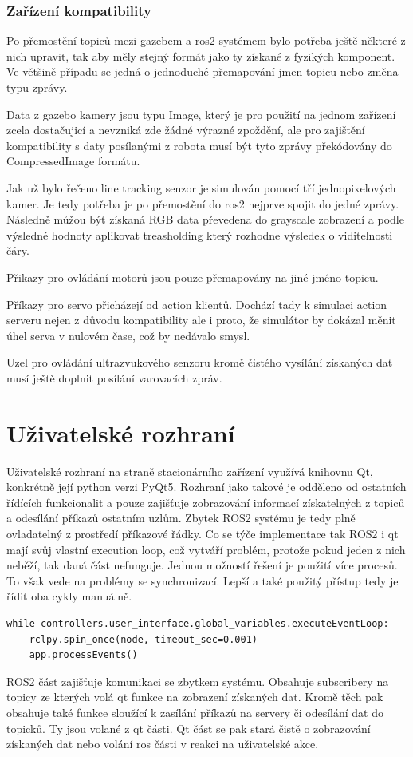 \subsubsection*{Zařízení kompatibility}
Po přemostění topiců mezi gazebem a ros2 systémem bylo potřeba ještě některé z nich upravit, tak aby měly stejný formát jako ty získané z fyzikých komponent. Ve většině případu se jedná o jednoduché přemapování jmen topicu nebo změna typu zprávy. 

Data z gazebo kamery jsou typu Image, který je pro použití na jednom zařízení zcela dostačujicí a nevzniká zde žádné výrazné zpoždění, ale pro zajištění kompatibility s daty posílanými z robota musí být tyto zprávy překódovány do CompressedImage formátu. 

Jak už bylo řečeno line tracking senzor je simulován pomocí tří jednopixelových kamer. Je tedy potřeba je po přemostění do ros2 nejprve spojit do jedné zprávy. Následně můžou být získaná RGB data převedena do grayscale zobrazení a podle výsledné hodnoty aplikovat treasholding který rozhodne výsledek o viditelnosti čáry.

Přikazy pro ovládání motorů jsou pouze přemapovány na jiné jméno topicu.

Příkazy pro servo přicházejí od action klientů. Dochází tady k simulaci action serveru nejen z důvodu kompatibility ale i proto, že simulátor by dokázal měnit úhel serva v nulovém čase, což by nedávalo smysl.

Uzel pro ovládání ultrazvukového senzoru kromě čistého vysílání získaných dat musí ještě doplnit posílání varovacích zpráv.

\section{Uživatelské rozhraní}
Uživatelské rozhraní na straně stacionárního zařízení využívá knihovnu Qt, konkrétně její python verzi PyQt5. Rozhraní jako takové je odděleno od ostatních řídících funkcionalit a pouze zajišťuje zobrazování informací získatelných z topiců a odesílání příkazů ostatním uzlům. Zbytek ROS2 systému je tedy plně ovladatelný z prostředí příkazové řádky. Co se týče implementace tak ROS2 i qt mají svůj vlastní execution loop, což vytváří problém, protože pokud jeden z nich neběží, tak daná část nefunguje. Jednou možností řešení je použití více procesů. To však vede na problémy se synchronizací. Lepší a také použitý přístup tedy je řídit oba cykly manuálně. 
\begin{verbatim}
while controllers.user_interface.global_variables.executeEventLoop:
	rclpy.spin_once(node, timeout_sec=0.001)
	app.processEvents()
\end{verbatim}
ROS2 část zajišťuje komunikaci se zbytkem systému. Obsahuje subscribery na topicy ze kterých volá qt funkce na zobrazení získaných dat. Kromě těch pak obsahuje také funkce sloužící k zasílání příkazů na servery či odesílání dat do topicků. Ty jsou volané z qt části.
Qt část se pak stará čistě o zobrazování získaných dat nebo volání ros části v reakci na uživatelské akce.

